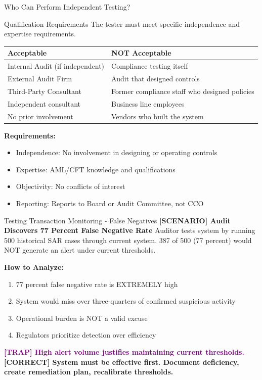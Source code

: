 \documentclass[11pt,a4paper]{beamer}
\newcommand{\trap}[1]{\textcolor{purple}{\textbf{[TRAP] #1}}}
\newcommand{\correct}[1]{\textcolor{green!50!black}{\textbf{[CORRECT] #1}}}
\newcommand{\scenario}[1]{\textcolor{blue!70!black}{\textbf{[SCENARIO] #1}}}
\begin{document}
	\begin{frame}{Who Can Perform Independent Testing?}
		\begin{block}{Qualification Requirements}
			The tester must meet specific independence and expertise requirements.
		\end{block}
		\begin{tabular}{p{}|p{}}
			\hline
			\rowcolor{lightgray}
			\textbf{Acceptable} & \textbf{NOT Acceptable} \\
			\hline
			Internal Audit (if independent) & Compliance testing itself \\
			External Audit Firm & Audit that designed controls \\
			Third-Party Consultant & Former compliance staff who designed policies \\
			Independent consultant & Business line employees \\
			No prior involvement & Vendors who built the system \\
			\hline
		\end{tabular}
		\textbf{Requirements:}
		\begin{itemize}
			\item Independence: No involvement in designing or operating controls
			\item Expertise: AML/CFT knowledge and qualifications
			\item Objectivity: No conflicts of interest
			\item Reporting: Reports to Board or Audit Committee, not CCO
		\end{itemize}
	\end{frame}
	
	\begin{frame}{Testing Transaction Monitoring - False Negatives}
		\scenario{Audit Discovers 77 Percent False Negative Rate}
		Auditor tests system by running 500 historical SAR cases through current system. 387 of 500 (77 percent) would NOT generate an alert under current thresholds.
		
		\vspace{0.1cm}
		\textbf{How to Analyze:}
		\begin{enumerate}
			\item 77 percent false negative rate is EXTREMELY high
			\item System would miss over three-quarters of confirmed suspicious activity
			\item Operational burden is NOT a valid excuse
			\item Regulators prioritize detection over efficiency
		\end{enumerate}
		\trap{High alert volume justifies maintaining current thresholds.}
		\correct{System must be effective first. Document deficiency, create remediation plan, recalibrate thresholds.}
	\end{frame}
	
\end{document}
